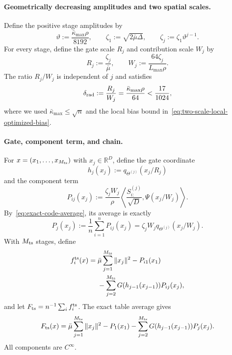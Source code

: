 \documentclass{article}
\newcommand{\R}{\mathbb{R}}
\theoremstyle{definition}
\begin{document}
\paragraph{Geometrically decreasing amplitudes and two spatial scales.}
Define the positive stage amplitudes by
\begin{equation}
 \vartheta:=\frac{\bar\kappa_{\max}\rho}{8192},
 \qquad
 \zeta_1:=\sqrt{2\bar\mu\Delta},
 \qquad
 \zeta_j:=\zeta_1\vartheta^{j-1}.
 \label{eq:two-scale-amplitudes}
\end{equation}
For every stage, define the gate scale $R_j$ and contribution scale $W_j$ by
\begin{equation}
 R_j:=\frac{\zeta_j}{\bar\mu},
 \qquad
 W_j:=\frac{64\zeta_j}{L_{\max}\rho}.
 \label{eq:two-scale-radii}
\end{equation}
The ratio $R_j/W_j$ is independent of $j$ and satisfies
\begin{equation}
 \delta_{\rm rad}:=\frac{R_j}{W_j}
 =\frac{\bar\kappa_{\max}\rho}{64}
 <\frac{17}{1024},
 \label{eq:two-scale-radius-ratio}
\end{equation}
where we used $\bar\kappa_{\max}\le\sqrt n$ and the local bias bound
in~\eqref{eq:two-scale-local-optimized-bias}.

\paragraph{Gate, component term, and chain.}
For $x=(x_1,\ldots,x_{M_{\rm ts}})$ with $x_j\in\R^D$, define the gate
coordinate
\begin{equation}
 h_j(x_j):=q_{\Theta^{(j)}}(x_j/R_j)
 \label{eq:two-scale-gate-coordinate}
\end{equation}
and the component term
\begin{equation}
 P_{ij}(x_j)
 :=\frac{\zeta_jW_j}{\rho}
 \left\langle\frac{S^{(j)}_{i:}}{\sqrt D},
 \Psi(x_j/W_j)\right\rangle.
 \label{eq:two-scale-component-payload}
\end{equation}
By~\eqref{eq:exact-code-average}, its average is exactly
\begin{equation}
 P_j(x_j):=\frac1n\sum_{i=1}^nP_{ij}(x_j)
 =\zeta_jW_j q_{\Theta^{(j)}}(x_j/W_j).
 \label{eq:two-scale-average-payload}
\end{equation}
With $M_{\rm ts}$ stages, define
\begin{equation}
\begin{aligned}
 f_i^{\rm ts}(x)
 ={}&\bar\mu\sum_{j=1}^{M_{\rm ts}}\|x_j\|^2-P_{i1}(x_1)\\
 &-\sum_{j=2}^{M_{\rm ts}}
 G(h_{j-1}(x_{j-1}))P_{ij}(x_j),
\end{aligned}
\label{eq:two-scale-component-chain}
\end{equation}
and let $F_{\rm ts}=n^{-1}\sum_i f_i^{\rm ts}$.  The exact table average gives
\begin{equation}
 F_{\rm ts}(x)
 =\bar\mu\sum_{j=1}^{M_{\rm ts}}\|x_j\|^2-P_1(x_1)
 -\sum_{j=2}^{M_{\rm ts}}
 G(h_{j-1}(x_{j-1}))P_j(x_j).
 \label{eq:two-scale-average-chain}
\end{equation}
All components are $C^\infty$.
\end{document}
